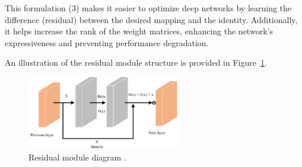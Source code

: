This formulation (3) makes it easier to optimize deep networks by learning the difference (residual) between the desired mapping and the identity. Additionally, it helps increase the rank of the weight matrices, enhancing the network’s expressiveness and preventing performance degradation.

An illustration of the residual module structure is provided in Figure~\ref{fig:figure11}.


\begin{figure}[H] %
    \centering
    \includegraphics[width=0.6\textwidth]{chapters/chapter1/images/Figure11.png}
    \caption{Residual module diagram \parencite{fang2023lightweight}.}
    \label{fig:figure11}
\end{figure}







